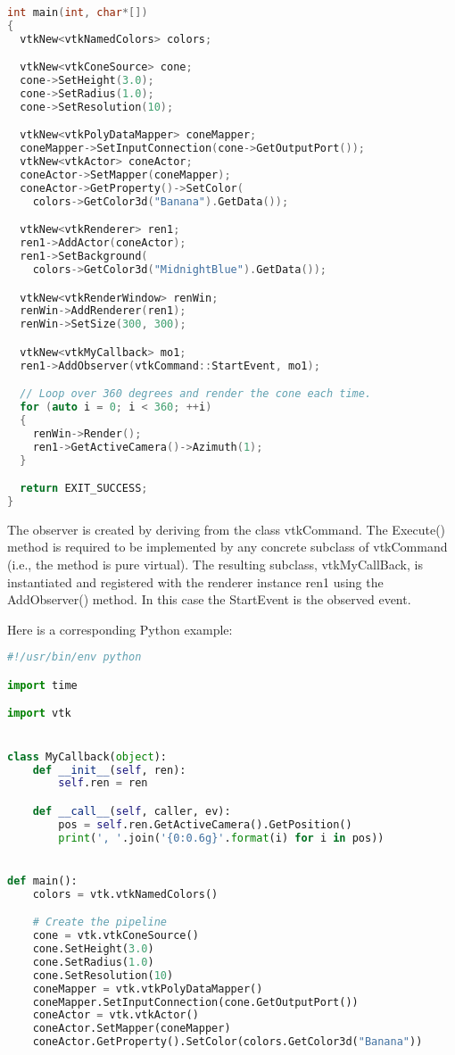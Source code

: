 \begin{description}[leftmargin=0cm,labelindent=0cm]
\begin{lstlisting}[language=C++, caption={Cone2.cxx}, label={lst:Cone2_cxx}, escapechar=\$]
int main(int, char*[])
{
  vtkNew<vtkNamedColors> colors;

  vtkNew<vtkConeSource> cone;
  cone->SetHeight(3.0);
  cone->SetRadius(1.0);
  cone->SetResolution(10);

  vtkNew<vtkPolyDataMapper> coneMapper;
  coneMapper->SetInputConnection(cone->GetOutputPort());
  vtkNew<vtkActor> coneActor;
  coneActor->SetMapper(coneMapper);
  coneActor->GetProperty()->SetColor(
    colors->GetColor3d("Banana").GetData());

  vtkNew<vtkRenderer> ren1;
  ren1->AddActor(coneActor);
  ren1->SetBackground(
    colors->GetColor3d("MidnightBlue").GetData());

  vtkNew<vtkRenderWindow> renWin;
  renWin->AddRenderer(ren1);
  renWin->SetSize(300, 300);

  vtkNew<vtkMyCallback> mo1;
  ren1->AddObserver(vtkCommand::StartEvent, mo1);

  // Loop over 360 degrees and render the cone each time.
  for (auto i = 0; i < 360; ++i)
  {
    renWin->Render();
    ren1->GetActiveCamera()->Azimuth(1);
  }

  return EXIT_SUCCESS;
}
\end{lstlisting}

The observer is created by deriving from the class vtkCommand. The Execute() method is required to be implemented by any concrete subclass of vtkCommand (i.e., the method is pure virtual). The resulting subclass, vtkMyCallBack, is instantiated and registered with the renderer instance ren1 using the AddObserver() method. In this case the StartEvent is the observed event.

Here is a corresponding Python example:
\begin{lstlisting}[language=Python, caption={Cone2.py}, escapechar=\$]
#!/usr/bin/env python

import time

import vtk


class MyCallback(object):
    def __init__(self, ren):
        self.ren = ren

    def __call__(self, caller, ev):
        pos = self.ren.GetActiveCamera().GetPosition()
        print(', '.join('{0:0.6g}'.format(i) for i in pos))


def main():
    colors = vtk.vtkNamedColors()

    # Create the pipeline
    cone = vtk.vtkConeSource()
    cone.SetHeight(3.0)
    cone.SetRadius(1.0)
    cone.SetResolution(10)
    coneMapper = vtk.vtkPolyDataMapper()
    coneMapper.SetInputConnection(cone.GetOutputPort())
    coneActor = vtk.vtkActor()
    coneActor.SetMapper(coneMapper)
    coneActor.GetProperty().SetColor(colors.GetColor3d("Banana"))


\end{lstlisting}
\end{description}
